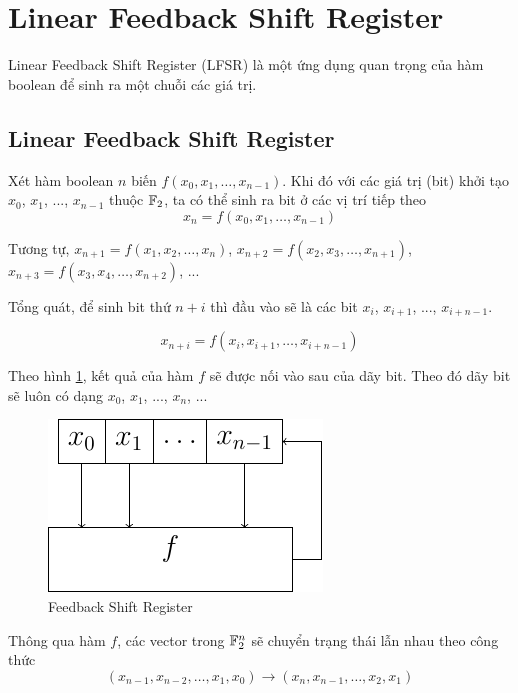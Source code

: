 \section{Linear Feedback Shift Register}

Linear Feedback Shift Register (LFSR) là một ứng dụng quan trọng của hàm boolean để sinh ra một chuỗi các giá trị.

\subsection*{Linear Feedback Shift Register}

Xét hàm boolean $n$ biến $f(x_0, x_1, \ldots, x_{n-1})$. Khi đó với các giá trị (bit) khởi tạo $x_0$, $x_1$, ..., $x_{n-1}$ thuộc $\mathbb{F}_2$, ta có thể sinh ra bit ở các vị trí tiếp theo \[x_{n} = f(x_0, x_1, \ldots, x_{n-1})\]

Tương tự, $x_{n+1} = f(x_1, x_2, \ldots, x_n)$, $x_{n+2} = f(x_2, x_3, \ldots, x_{n+1})$, $x_{n+3} = f(x_3, x_4, \ldots, x_{n+2})$, ...

Tổng quát, để sinh bit thứ $n+i$ thì đầu vào sẽ là các bit $x_i$, $x_{i+1}$, ..., $x_{i+n-1}$.

\begin{equation}
	x_{n+i} = f(x_i, x_{i+1}, \ldots, x_{i+n-1})
\end{equation}

Theo hình \ref{lfsr:im1}, kết quả của hàm $f$ sẽ được nối vào sau của dãy bit. Theo đó dãy bit sẽ luôn có dạng $x_0$, $x_1$, ..., $x_n$, ...

\begin{figure}[ht]
	\centering
	\includegraphics[page=1]{figures/boolean/lfsr.pdf}
	\caption{Feedback Shift Register}
	\label{lfsr:im1}
\end{figure}

Thông qua hàm $f$, các vector trong $\mathbb{F}_2^n$ sẽ chuyển trạng thái lẫn nhau theo công thức 
\begin{equation}
	(x_{n-1}, x_{n-2}, \ldots, x_1, x_0) \to (x_n, x_{n-1}, \ldots, x_2, x_1)
\end{equation}

